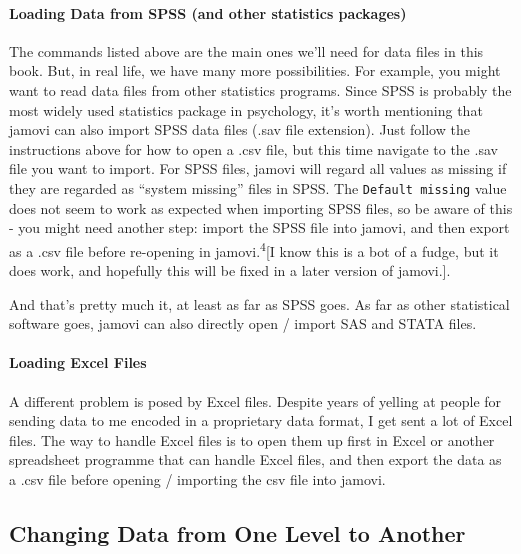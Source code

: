 \documentclass[
]{book}
\begin{document}
\hypertarget{loading-data-from-spss-and-other-statistics-packages}{%
\paragraph{Loading Data from SPSS (and other statistics packages)}\label{loading-data-from-spss-and-other-statistics-packages}}

The commands listed above are the main ones we'll need for data files in this book. But, in real life, we have many more possibilities. For example, you might want to read data files from other statistics programs. Since SPSS is probably the most widely used statistics package in psychology, it's worth mentioning that jamovi can also import SPSS data files (.sav file extension). Just follow the instructions above for how to open a .csv file, but this time navigate to the .sav file you want to import. For SPSS files, jamovi will regard all values as missing if they are regarded as ``system missing'' files in SPSS. The \texttt{Default\ missing} value does not seem to work as expected when importing SPSS files, so be aware of this - you might need another step: import the SPSS file into jamovi, and then export as a .csv file before re-opening in jamovi.\textsuperscript{4}{[}I know this is a bot of a fudge, but it does work, and hopefully this will be fixed in a later version of jamovi.{]}.

And that's pretty much it, at least as far as SPSS goes. As far as other statistical software goes, jamovi can also directly open / import SAS and STATA files.

\hypertarget{loading-excel-files}{%
\paragraph{Loading Excel Files}\label{loading-excel-files}}

A different problem is posed by Excel files. Despite years of yelling at people for sending data to me encoded in a proprietary data format, I get sent a lot of Excel files. The way to handle Excel files is to open them up first in Excel or another spreadsheet programme that can handle Excel files, and then export the data as a .csv file before opening / importing the csv file into jamovi.

\hypertarget{changing-data-from-one-level-to-another}{%
\subsection{Changing Data from One Level to Another}\label{changing-data-from-one-level-to-another}}
\end{document}

